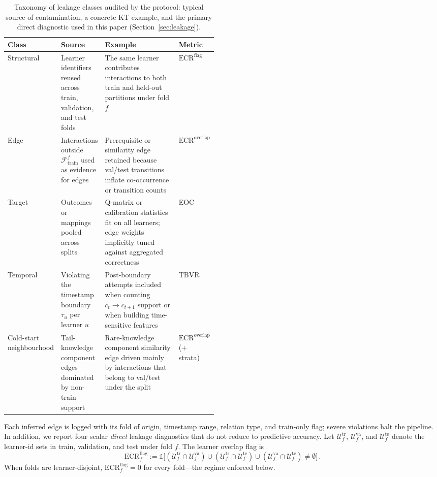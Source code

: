 \documentclass[pdflatex,sn-basic]{sn-jnl}
\newcommand{\KC}{knowledge component}
\begin{document}
\begin{table}[t]
\centering
\caption{Taxonomy of leakage classes audited by the protocol: typical
source of contamination, a concrete KT example, and the primary
direct diagnostic used in this paper (Section~\ref{sec:leakage}).}
\label{tab:leakage-taxonomy}
\footnotesize
\setlength{\tabcolsep}{3pt}
\begin{tabularx}{\linewidth}{@{} >{\RaggedRight\arraybackslash}p{0.14\linewidth} >{\RaggedRight\arraybackslash}p{0.18\linewidth} >{\RaggedRight\arraybackslash}X >{\RaggedRight\arraybackslash}p{0.16\linewidth} @{}}
\toprule
Class & Source & Example & Metric \\
\midrule
Structural &
Learner identifiers reused across train, validation, and test folds &
The same learner contributes interactions to both train and held-out partitions under fold $f$ &
$\mathrm{ECR}^{\mathrm{flag}}$ \\
Edge &
Interactions outside $\mathcal{F}_{\text{train}}^f$ used as evidence for edges &
Prerequisite or similarity edge retained because val/test transitions inflate co-occurrence or transition counts &
$\mathrm{ECR}^{\mathrm{overlap}}$ \\
Target &
Outcomes or mappings pooled across splits &
Q-matrix or calibration statistics fit on all learners; edge weights implicitly tuned against aggregated correctness &
EOC \\
Temporal &
Violating the timestamp boundary $\tau_u$ per learner $u$ &
Post-boundary attempts included when counting $c_t\!\to\!c_{t+1}$ support or when building time-sensitive features &
TBVR \\
Cold-start neighbourhood &
Tail-\KC{} edges dominated by non-train support &
Rare-\KC{} similarity edge driven mainly by interactions that belong to val/test under the split &
$\mathrm{ECR}^{\mathrm{overlap}}$ (+ strata) \\
\bottomrule
\end{tabularx}
\end{table}

Each inferred edge is logged with its fold of origin, timestamp range,
relation type, and train-only flag; severe violations halt the pipeline.
In addition, we report four scalar \emph{direct} leakage diagnostics that do
not reduce to predictive accuracy. Let $\mathcal{U}^{\mathrm{tr}}_f$,
$\mathcal{U}^{\mathrm{va}}_f$, and $\mathcal{U}^{\mathrm{te}}_f$ denote the
learner-id sets in train, validation, and test under fold $f$. The learner overlap flag is
\begin{equation}
\mathrm{ECR}^{\mathrm{flag}}_f := \mathbb{1}\big[
(\mathcal{U}^{\mathrm{tr}}_f \cap \mathcal{U}^{\mathrm{va}}_f) \cup
(\mathcal{U}^{\mathrm{tr}}_f \cap \mathcal{U}^{\mathrm{te}}_f) \cup
(\mathcal{U}^{\mathrm{va}}_f \cap \mathcal{U}^{\mathrm{te}}_f)
\neq \emptyset
\big]\,.
\label{eq:ecr-flag}
\end{equation}
When folds are learner-disjoint, $\mathrm{ECR}^{\mathrm{flag}}_f=0$ for every fold---the regime enforced below.
\end{document}
